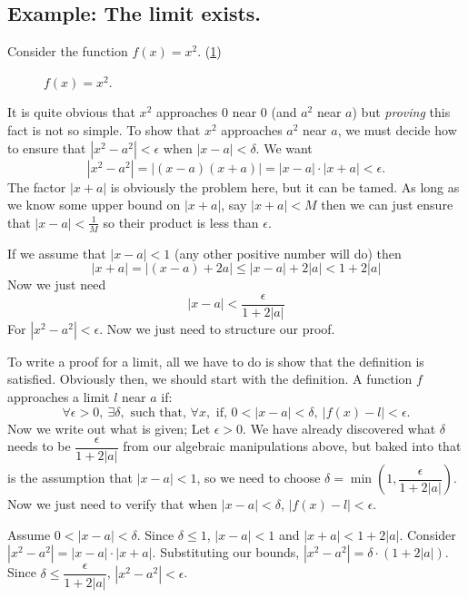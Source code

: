 \documentclass[10pt]{book}
\begin{document}
\subsection{Example: The limit exists.}
Consider the function $f(x)=x^{2}$. (\cref{fig:x2})
\begin{figure}[H]
  \centering
  \caption{$f(x)=x^2$.}
  \label{fig:x2}
\end{figure}
It is quite obvious that $x^2$ approaches 0 near 0 (and $a^2$ near $a$) but \emph{proving} this fact is not so simple.
To show that $x^2$ approaches $a^2$ near $a$, we must decide how to ensure that $|x^2-a^2| < \epsilon$ when $|x-a| < \delta$.
We want
\[
  |x^2-a^2| = |(x-a)(x+a)| = |x-a| \cdot |x+a| < \epsilon.
\]
The factor $|x+a|$ is obviously the problem here, but it can be tamed. As long as we know some upper bound on $|x+a|$, say
$|x+a|<M$ then we can just ensure that $|x-a|<\frac1M$ so their product is less than $\epsilon$.

If we assume that $|x-a| < 1$ (any other positive number will do) then
\[
  |x+a| = |(x-a)+2a| \le |x-a| + 2|a| < 1 + 2|a|
\]
Now we just need
\[
  |x-a| < \dfrac{\epsilon}{1+2|a|}
\]
For $|x^2-a^2|<\epsilon$. Now we just need to structure our proof.

To write a proof for a limit, all we have to do is show that the definition is satisfied. Obviously then, we should start
with the definition. A function $f$ approaches a limit $l$ near $a$ if:
\[
  \forall \epsilon > 0,\ \exists \delta, \text{ such that, } \forall x, \text{ if, } 0 < |x-a| < \delta,\ |f(x)-l| < \epsilon.
\]
Now we write out what is given; Let $\epsilon > 0$. We have already discovered what $\delta$ needs to be
$\dfrac{\epsilon}{1+2|a|}$ from our algebraic manipulations above, but baked into that is the assumption that $|x-a|<1$,
so we need to choose $\delta=\min\left(1, \dfrac{\epsilon}{1+2|a|}\right) $. Now we just need to verify that when $|x-a|<\delta$,
$|f(x)-l|<\epsilon$.

Assume $0< |x-a| < \delta$. Since $\delta \le 1$, $|x-a|<1$ and $|x+a|<1+2|a|$. Consider $|x^2-a^2| = |x-a|\cdot |x+a|$.
Substituting our bounds, $|x^2-a^2| = \delta \cdot (1+2|a|)$. Since $\delta \le \dfrac{\epsilon}{1+2|a|}$,
$|x^2-a^2| < \epsilon$.
\end{document}
